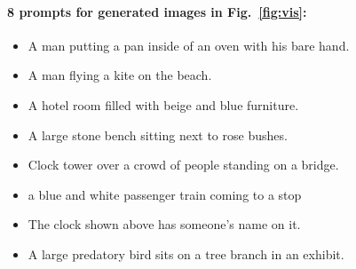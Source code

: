 \paragraph{8 prompts for generated images in Fig.~\ref{fig:vis}:}
\begin{itemize}
\item A man putting a pan inside of an oven with his bare hand.
\item A man flying a kite on the beach. 
\item A hotel room filled with beige and blue furniture.
\item A large stone bench sitting next to rose bushes.
\item Clock tower over a crowd of people standing on a bridge.
\item a blue and white passenger train coming to a stop
\item The clock shown above has someone's name on it.
\item A large predatory bird sits on a tree branch in an exhibit.
\end{itemize}

\vspace{-5pt}
